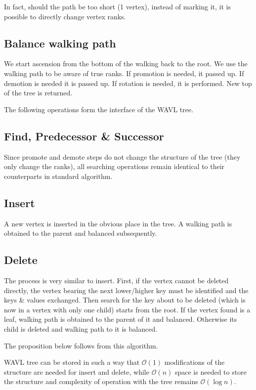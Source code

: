 In fact, should the path be too short (1 vertex), instead of marking it, it is possible to directly change vertex ranks.

\subsection{Balance walking path}

We start ascension from the bottom of the walking back to the root. We use the walking path to be aware of true ranks. If promotion is needed, it passed up. If demotion is needed it is passed up. If rotation is needed, it is performed. New top of the tree is returned. 

The following operations form the interface of the WAVL tree.

\subsection{Find, Predecessor \& Successor}

Since promote and demote steps do not change the structure of the tree (they only change the ranks), all searching operations remain identical to their counterparts in standard algorithm.

\subsection{Insert}

A new vertex is inserted in the obvious place in the tree. A walking path is obtained to the parent and balanced subsequently.

\subsection{Delete}

The process is very similar to insert. First, if the vertex cannot be deleted directly, the vertex bearing the next lower/higher key must be identified and the keys \& values exchanged. Then search for the key about to be deleted (which is now in a vertex with only one child) starts from the root. If the vertex found is a leaf, walking path is obtained to the parent of it and balanced. Otherwise its child is deleted and walking path to it is balanced.

The proposition below follows from this algorithm.

\begin{prop}
WAVL tree can be stored in such a way that $\mathcal{O}(1)$ modifications of the structure are needed for insert and delete, while $\mathcal{O}(n)$ space is needed to store the structure and complexity of operation with the tree remains $\mathcal{O}(\log n)$.
\end{prop}
